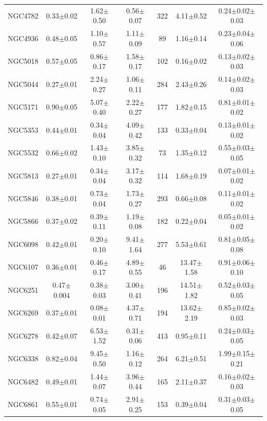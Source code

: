 \documentclass[iop]{emulateapj}
\begin{document}
\begin{table}
\begin{tabular}{lcccccc}
NGC4782 & 0.33$\pm$0.02 & 1.62$\pm$0.50 & 0.56$\pm$0.07 & 322 & 4.11$\pm$0.52 & 0.24$\pm$0.02$\pm$0.03    \\
NGC4936 & 0.48$\pm$0.05 & 1.10$\pm$0.57 & 1.11$\pm$0.09  & 89 & 1.16$\pm$0.14 & 0.23$\pm$0.04$\pm$0.06  \\
NGC5018 & 0.57$\pm$0.05 & 0.86$\pm$0.17 & 1.58$\pm$0.17  & 102  & 0.16$\pm$0.02 & 0.13$\pm$0.02$\pm$0.03  \\  
NGC5044 & 0.27$\pm$0.01 & 2.24$\pm$0.27 & 1.06$\pm$0.11 & 284 & 2.43$\pm$0.26 & 0.14$\pm$0.02$\pm$0.03  \\
NGC5171 & 0.90$\pm$0.05 & 5.07$\pm$0.40 & 2.22$\pm$0.27  & 177 & 1.82$\pm$0.15 & 0.81$\pm$0.01$\pm$0.02   \\
NGC5353 & 0.44$\pm$0.01 & 0.34$\pm$0.04 & 4.09$\pm$0.42 & 133 & 0.33$\pm$0.04 & 0.13$\pm$0.01$\pm$0.02    \\
NGC5532 & 0.66$\pm$0.02 & 1.43$\pm$0.10 & 3.85$\pm$0.32 & 73 & 1.35$\pm$0.12  & 0.55$\pm$0.03$\pm$0.05   \\
NGC5813 & 0.27$\pm$0.01 & 0.34$\pm$0.04 & 3.17$\pm$0.32 & 114 & 1.68$\pm$0.19 & 0.07$\pm$0.01$\pm$0.02   \\
NGC5846 & 0.38$\pm$0.01 & 0.73$\pm$0.04 & 1.73$\pm$0.27 & 293 & 0.66$\pm$0.08  & 0.11$\pm$0.01$\pm$0.02   \\
NGC5866 & 0.37$\pm$0.02 & 0.39$\pm$0.11 & 1.19$\pm$0.08 & 182 & 0.22$\pm$0.04 & 0.05$\pm$0.01$\pm$0.02 \\
NGC6098 & 0.42$\pm$0.01 & 0.20$\pm$0.10 & 9.41$\pm$1.64 & 277 & 5.53$\pm$0.61 & 0.81$\pm$0.05$\pm$0.08   \\
NGC6107 & 0.36$\pm$0.01 & 0.46$\pm$0.17 & 4.89$\pm$0.55 & 46 & 13.47$\pm$1.58 & 0.91$\pm$0.06$\pm$0.10   \\
NGC6251 & 0.47$\pm$0.004 & 0.38$\pm$0.03 & 3.00$\pm$0.41 & 196 & 14.51$\pm$1.82 & 0.52$\pm$0.03$\pm$0.05   \\
NGC6269 & 0.37$\pm$0.01 & 0.08$\pm$0.01 & 4.37$\pm$0.71 & 194 & 13.62$\pm$2.19 & 0.85$\pm$0.02$\pm$0.03   \\
NGC6278 & 0.42$\pm$0.07 & 6.53$\pm$1.52 & 0.31$\pm$0.06 & 413 & 0.95$\pm$0.11 & 0.24$\pm$0.03$\pm$0.05 \\
NGC6338 & 0.82$\pm$0.04 & 9.45$\pm$0.50 & 1.16$\pm$0.12 & 264 & 6.21$\pm$0.51 & 1.99$\pm$0.15$\pm$0.21  \\
NGC6482 & 0.49$\pm$0.01 & 1.44$\pm$0.07 & 3.96$\pm$0.44 & 165 & 2.11$\pm$0.37 & 0.16$\pm$0.02$\pm$0.03   \\
NGC6861 & 0.55$\pm$0.01 & 0.74$\pm$0.05 & 2.91$\pm$0.25 & 153 & 0.39$\pm$0.04 & 0.31$\pm$0.03$\pm$0.05   \\

\end{tabular}
\end{table}
\end{document}
